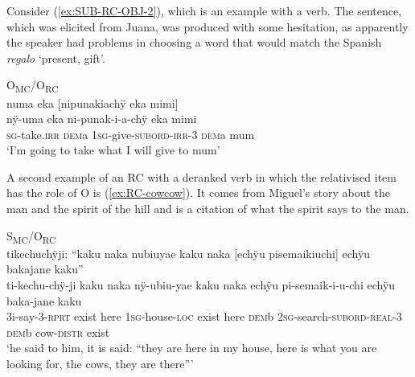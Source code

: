 Consider (\ref{ex:SUB-RC-OBJ-2}), which is an example with a  verb. The sentence, which was elicited from Juana, was produced with some hesitation, as apparently the speaker had problems in choosing a word that would match the Spanish \textit{regalo} ‘present, gift’.



\ea\label{ex:SUB-RC-OBJ-2}
\begingl
\glpreamble \textup{O\textsubscript{MC}/O\textsubscript{RC}}\\numa eka \textup{[}nipunakiachÿ eka mimi\textup{]}\\
\gla nÿ-uma eka ni-punak-i-a-chÿ eka mimi\\
\textsc{sg}-take.\textsc{irr} \textsc{dem}a 1\textsc{sg}-give-\textsc{subord}-\textsc{irr}-3 \textsc{dem}a mum\\
\glft ‘I’m going to take what I will give to mum’
\endgl
\trailingcitation{[jxx-e191021ls-2]}
\xe

A second example of an RC with a deranked verb in which the relativised item has the role of O is (\ref{ex:RC-cowcow}). It comes from Miguel’s story about the man and the spirit of the hill and is a citation of what the spirit says to the man.

\ea\label{ex:RC-cowcow}
\begingl 
\glpreamble  \textup{S\textsubscript{MC}/O\textsubscript{RC}}\\tikechuchÿji: “kaku naka nubiuyae kaku naka \textup{[}echÿu pisemaikiuchi\textup{]} echÿu bakajane kaku”\\
\gla ti-kechu-chÿ-ji kaku naka nÿ-ubiu-yae kaku naka echÿu pi-semaik-i-u-chi echÿu baka-jane kaku\\ 
\glb 3i-say-3-\textsc{rprt} exist here 1\textsc{sg}-house-\textsc{loc} exist here \textsc{dem}b 2\textsc{sg}-search-\textsc{subord}-\textsc{real}-3 \textsc{dem}b cow-\textsc{distr} exist\\ 
\glft ‘he said to him, it is said: “they are here in my house, here is what you are looking for, the cows, they are there”’
\xe

